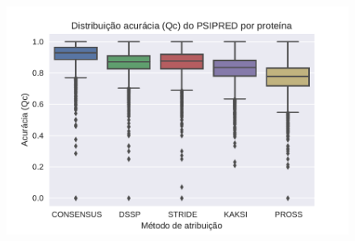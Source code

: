 \begin{figure}
    \includegraphics[width=\linewidth]{../figures/psipred_qc.pdf}
    \caption{}
    \label{fig:psipred_qc}
\end{figure}